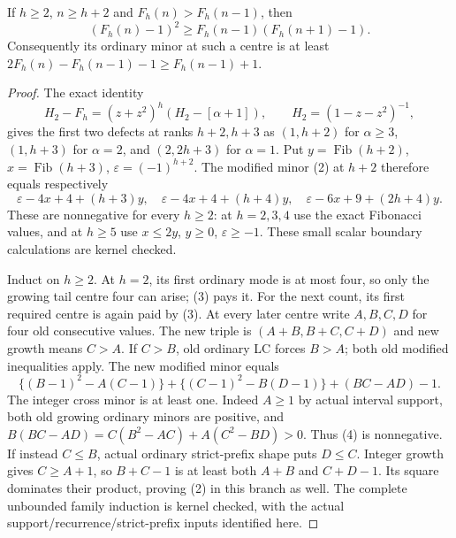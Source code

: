 \begin{lemma}
If $h\ge2$, $n\ge h+2$ and $F_h(n)>F_h(n-1)$, then
\[
                (F_h(n)-1)^2\ge F_h(n-1)(F_h(n+1)-1).  \tag{2}
\]
Consequently its ordinary minor at such a centre is at least
$2F_h(n)-F_h(n-1)-1\ge F_h(n-1)+1$.
\end{lemma}
\begin{proof}
The exact identity
\[
 H_2-F_h=(z+z^2)^h(H_2-[\alpha+1]),\qquad
                            H_2=(1-z-z^2)^{-1},
\]
gives the first two defects at ranks $h+2,h+3$ as
$(1,h+2)$ for $\alpha\ge3$, $(1,h+3)$ for $\alpha=2$,
and $(2,2h+3)$ for $\alpha=1$.
Put $y=\operatorname{Fib}(h+2)$, $x=\operatorname{Fib}(h+3)$,
$\varepsilon=(-1)^{h+2}$.  The modified minor (2) at $h+2$
therefore equals respectively
\[
 \varepsilon-4x+4+(h+3)y,\quad
 \varepsilon-4x+4+(h+4)y,\quad
 \varepsilon-6x+9+(2h+4)y.                              \tag{3}
\]
These are nonnegative for every $h\ge2$: at $h=2,3,4$ use
the exact Fibonacci values, and at $h\ge5$ use
$x\le2y$, $y\ge0$, $\varepsilon\ge-1$.
These small scalar boundary calculations are kernel checked.

Induct on $h\ge2$.  At $h=2$, its first ordinary mode is at
most four, so only the growing tail centre four can arise; (3) pays it.
For the next count, its first required centre is again paid by (3).
At every later centre write $A,B,C,D$ for four old consecutive values.
The new triple is $(A+B,B+C,C+D)$ and new growth means $C>A$.
If $C>B$, old ordinary LC forces $B>A$; both old modified
inequalities apply.  The new modified minor equals
\[
 \{(B-1)^2-A(C-1)\}+\{(C-1)^2-B(D-1)\}+(BC-AD)-1.     \tag{4}
\]
The integer cross minor is at least one.  Indeed $A\ge1$ by
actual interval support, both old growing ordinary minors are positive,
and $B(BC-AD)=C(B^2-AC)+A(C^2-BD)>0$.
Thus (4) is nonnegative.
If instead $C\le B$, actual ordinary strict-prefix shape puts
$D\le C$.  Integer growth gives $C\ge A+1$, so $B+C-1$
is at least both $A+B$ and $C+D-1$.  Its square dominates
their product, proving (2) in this branch as well.
The complete unbounded family induction is kernel checked,
with the actual support/recurrence/strict-prefix inputs identified here.
\end{proof}

